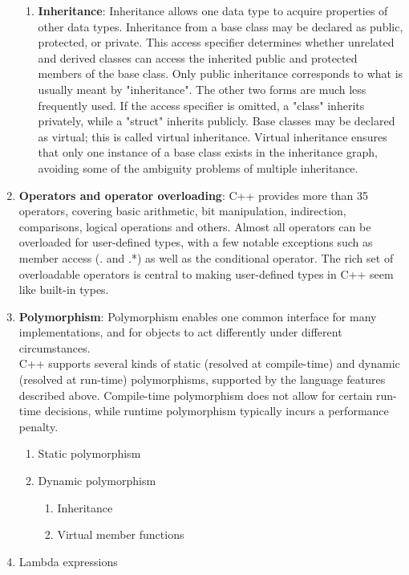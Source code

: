 \begin{enumerate}
\begin{enumerate}
		\item \textbf{Inheritance}: Inheritance allows one data type to acquire properties of other data types. Inheritance from a base class may be declared as public, protected, or private. This access specifier determines whether unrelated and derived classes can access the inherited public and protected members of the base class. Only public inheritance corresponds to what is usually meant by "inheritance". The other two forms are much less frequently used. If the access specifier is omitted, a "class" inherits privately, while a "struct" inherits publicly. Base classes may be declared as virtual; this is called virtual inheritance. Virtual inheritance ensures that only one instance of a base class exists in the inheritance graph, avoiding some of the ambiguity problems of multiple inheritance.
	\end{enumerate}
	\item \textbf{Operators and operator overloading}: C++ provides more than 35 operators, covering basic arithmetic, bit manipulation, indirection, comparisons, logical operations and others. Almost all operators can be overloaded for user-defined types, with a few notable exceptions such as member access (. and .*) as well as the conditional operator. The rich set of overloadable operators is central to making user-defined types in C++ seem like built-in types.\\
	\item \textbf{Polymorphism}: Polymorphism enables one common interface for many implementations, and for objects to act differently under different circumstances.\\
	C++ supports several kinds of static (resolved at compile-time) and dynamic (resolved at run-time) polymorphisms, supported by the language features described above. Compile-time polymorphism does not allow for certain run-time decisions, while runtime polymorphism typically incurs a performance penalty.
	\begin{enumerate}
		\item Static polymorphism
		\item Dynamic polymorphism
		\begin{enumerate}
			\item Inheritance
			\item Virtual member functions
		\end{enumerate}
	\end{enumerate}
\item Lambda expressions

\end{enumerate}
